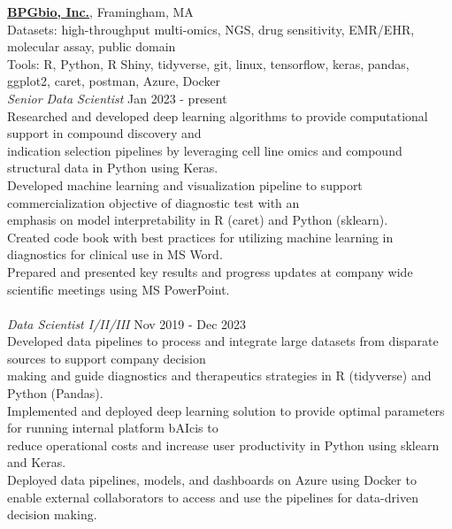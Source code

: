 \documentclass[a4paper]{article}
\newcommand{\mybullet}{
	\indent 
  \textbullet \hspace*{2mm}
}
\begin{document}
  \noindent
  \textbf{\href{https://www.bpgbio.com/}{BPGbio, Inc.}}, Framingham, MA \\
  Datasets: high-throughput multi-omics, NGS, drug sensitivity, EMR/EHR, molecular assay, public domain \\
  Tools: R, Python, R Shiny, tidyverse, git, linux, tensorflow, keras, pandas, ggplot2, caret, postman, Azure, Docker \\
  \textit{Senior Data Scientist} \hfill Jan 2023 - present \\
  \mybullet Researched and developed deep learning algorithms to provide computational support in compound discovery and \\\hspace*{10mm}indication selection pipelines by leveraging cell line omics and compound structural data in Python using Keras. \\
  \mybullet Developed machine learning and visualization pipeline to support commercialization objective of diagnostic test with an \\\hspace*{10mm}emphasis on model interpretability in R (caret) and Python (sklearn). \\
  \mybullet Created code book with best practices for utilizing machine learning in diagnostics for clinical use in MS Word. \\
  \mybullet Prepared and presented key results and progress updates at company wide scientific meetings using MS PowerPoint. \\
  \\
  \textit{Data Scientist I/II/III} \hfill Nov 2019 - Dec 2023 \\
  \mybullet Developed data pipelines to process and integrate large datasets from disparate sources to support company decision \\\hspace*{10mm}making and guide diagnostics and therapeutics strategies in R (tidyverse) and Python (Pandas). \\
  \mybullet Implemented and deployed deep learning solution to provide optimal parameters for running internal platform bAIcis to \\\hspace*{10mm}reduce operational costs and increase user productivity in Python using sklearn and Keras. \\
  \mybullet Deployed data pipelines, models, and dashboards on Azure using Docker to enable external collaborators to access and \hspace*{10mm}use the pipelines for data-driven decision making. \\
\end{document}
